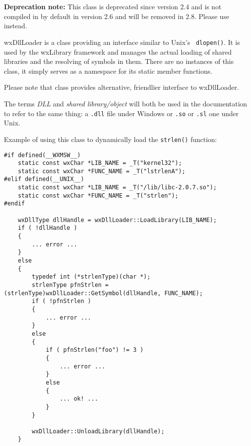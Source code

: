 
\section{}\label{wxdllloader}

\textbf{Deprecation note: } This class is deprecated since version 2.4 and is
not compiled in by default in version 2.6 and will be removed in 2.8. Please
use  instead.


wxDllLoader is a class providing an interface similar to Unix's {\tt
dlopen()}. It is used by the wxLibrary framework and manages the actual
loading of shared libraries and the resolving of symbols in them. There are no
instances of this class, it simply serves as a namespace for its static member
functions.

Please note that class  provides 
alternative, friendlier interface to wxDllLoader.

The terms {\it DLL} and {\it shared library/object} will both be used in the
documentation to refer to the same thing: a {\tt .dll} file under Windows or 
{\tt .so} or {\tt .sl} one under Unix.

Example of using this class to dynamically load the {\tt strlen()} function:

\begin{verbatim}
#if defined(__WXMSW__)
    static const wxChar *LIB_NAME = _T("kernel32");
    static const wxChar *FUNC_NAME = _T("lstrlenA");
#elif defined(__UNIX__)
    static const wxChar *LIB_NAME = _T("/lib/libc-2.0.7.so");
    static const wxChar *FUNC_NAME = _T("strlen");
#endif

    wxDllType dllHandle = wxDllLoader::LoadLibrary(LIB_NAME);
    if ( !dllHandle )
    {
        ... error ...
    }
    else
    {
        typedef int (*strlenType)(char *);
        strlenType pfnStrlen = (strlenType)wxDllLoader::GetSymbol(dllHandle, FUNC_NAME);
        if ( !pfnStrlen )
        {
            ... error ...
        }
        else
        {
            if ( pfnStrlen("foo") != 3 )
            {
                ... error ...
            }
            else
            {
                ... ok! ...
            }
        }

        wxDllLoader::UnloadLibrary(dllHandle);
    }
\end{verbatim}

